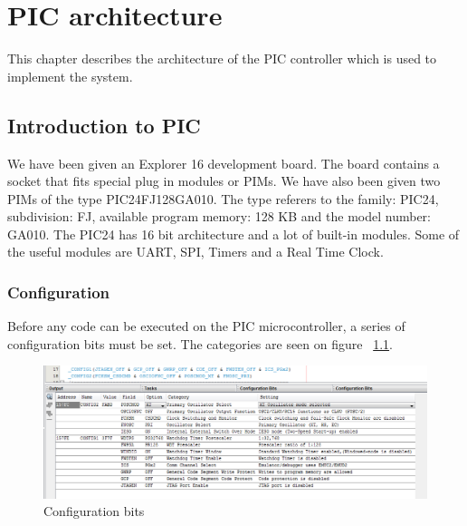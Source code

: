 \chapter{PIC architecture}
This chapter describes the architecture of the PIC controller which is used to implement the system.
\section{Introduction to PIC}
We have been given an Explorer 16 development board. The board contains a socket that fits special plug in modules or PIMs. We have also been given two PIMs of the type PIC24FJ128GA010. The type referers to the family: PIC24, subdivision: FJ, available program memory: 128 KB and the model number: GA010. The PIC24 has 16 bit architecture and a lot of built-in modules. Some of the useful modules are UART, SPI, Timers and a Real Time Clock. \\
\subsection{Configuration}
Before any code can be executed on the PIC microcontroller, a series of configuration bits must be set. The categories are seen on figure ~\ref{fig:config}.
\begin{figure}[H]
\centering
\includegraphics[width=1\textwidth]{billeder/config}
\caption{Configuration bits}
\label{fig:config}
\end{figure} 
